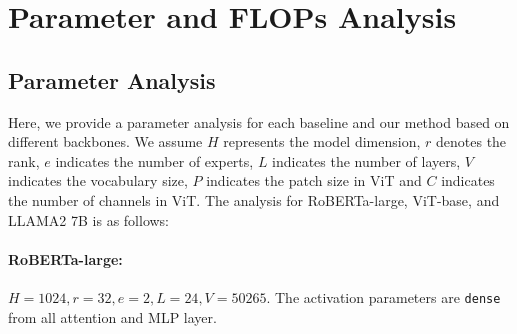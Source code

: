 \section{Parameter and FLOPs Analysis}

\subsection{Parameter Analysis}\label{app:parameters}
Here, we provide a parameter analysis for each baseline and our method based on different backbones. We assume \( H \) represents the model dimension, \( r \) denotes the rank, \( e \) indicates the number of experts, \( L \) indicates the number of layers, \( V \) indicates the vocabulary size, $P$ indicates the patch size in ViT and $C$ indicates the number of channels in ViT. The analysis for RoBERTa-large, ViT-base, and LLAMA2 7B is as follows:

\paragraph{RoBERTa-large:} $H=1024, r=32, e=2, L=24, V=50265$. The activation parameters are \texttt{dense} from all attention and MLP layer. 



